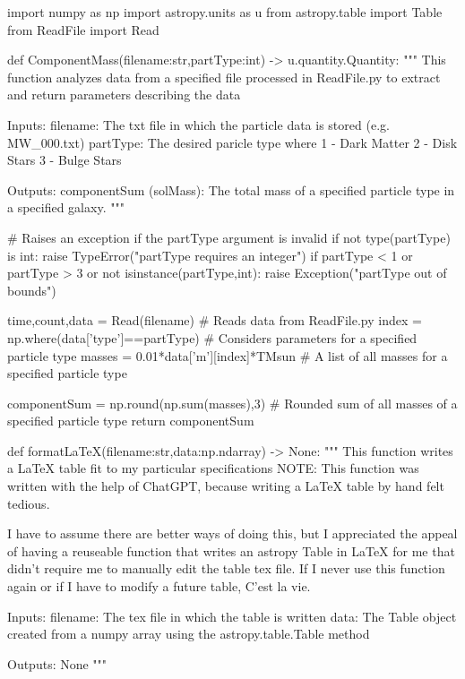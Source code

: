 import numpy as np
import astropy.units as u
from astropy.table import Table
from ReadFile import Read

def ComponentMass(filename:str,partType:int) -> u.quantity.Quantity:
    """
        This function analyzes data from a specified file processed in ReadFile.py to extract and return parameters describing the data

    Inputs:
        filename: The txt file in which the particle data is stored (e.g. MW_000.txt)
        partType: The desired paricle type where
            1 - Dark Matter
            2 - Disk Stars
            3 - Bulge Stars

    Outputs:
        componentSum (solMass): The total mass of a specified particle type in a specified galaxy.
    """

    # Raises an exception if the partType argument is invalid
    if not type(partType) is int:
        raise TypeError("partType requires an integer")
    if partType < 1 or partType > 3 or not isinstance(partType,int):
        raise Exception("partType out of bounds")

    time,count,data = Read(filename) # Reads data from ReadFile.py
    index = np.where(data['type']==partType) # Considers parameters for a specified particle type
    masses = 0.01*data['m'][index]*TMsun # A list of all masses for a specified particle type

    componentSum = np.round(np.sum(masses),3) # Rounded sum of all masses of a specified particle type
    return componentSum

def formatLaTeX(filename:str,data:np.ndarray) -> None:
    """
        This function writes a LaTeX table fit to my particular specifications
        NOTE: This function was written with the help of ChatGPT, because writing a
        LaTeX table by hand felt tedious.

        I have to assume there are better ways of doing this, but I appreciated the
        appeal of having a reuseable function that writes an astropy Table in LaTeX
        for me that didn't require me to manually edit the table tex file. If I
        never use this function again or if I have to modify a future table, C'est
        la vie.

    Inputs:
        filename: The tex file in which the table is written
        data: The Table object created from a numpy array using the
              astropy.table.Table method

    Outputs:
        None
    """

